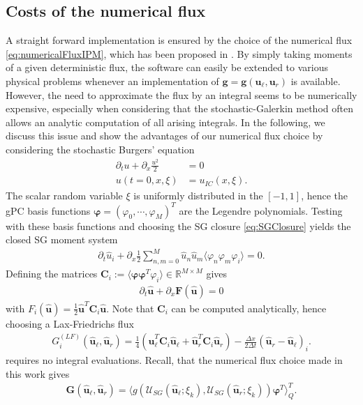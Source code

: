 \subsection{Costs of the numerical flux}
A straight forward implementation is ensured by the choice of the numerical flux \eqref{eq:numericalFluxIPM}, which has been proposed in \cite{kusch2017maximum}. By simply taking moments of a given deterministic flux, the software can easily be extended to various physical problems whenever an implementation of $\bm g = \bm g(\bm u_\ell, \bm u_r)$ is available. However, the need to approximate the flux by an integral seems to be numerically expensive, especially when considering that the stochastic-Galerkin method often allows an analytic computation of all arising integrals. In the following, we discuss this issue and show the advantages of our numerical flux choice by considering the stochastic Burgers' equation
\begin{align*}
\partial_t u + \partial_x \frac{u^2}{2} &= 0\\
u(t=0,x,\xi) &= u_{IC}(x,\xi).
\end{align*}
The scalar random variable $\xi$ is uniformly distributed in the $[-1,1]$, hence the gPC basis functions $\bm\varphi=(\varphi_0,\cdots,\varphi_M)^T$ are the Legendre polynomials. Testing with these basis functions and choosing the SG closure \eqref{eq:SGClosure} yields the closed SG moment system
\begin{align*}
\partial_t \hat u_i + \partial_x \frac12\sum_{n,m = 0}^M \hat u_n \hat u_m \langle \varphi_n\varphi_m\varphi_i \rangle = 0.
\end{align*}
Defining the matrices $\bm C_i := \langle \bm\varphi\bm\varphi^T\varphi_i\rangle\in\mathbb{R}^{M\times M}$ gives
\begin{align*}
\partial_t \bm{\hat u} + \partial_x \bm F(\bm{\hat u}) = 0
\end{align*}
with $F_i(\bm{\hat u}) = \frac12\bm{\hat u}^T\bm C_i\bm{\hat u}$. Note that $\bm{C}_i$ can be computed analytically, hence choosing a Lax-Friedrichs flux
\begin{align}\label{eq:numFluxAnalytic}
G_i^{(LF)}(\bm{\hat u}_{\ell},\bm{\hat u}_{r}) =\frac{1}{4}\left(\bm{\hat u}_{\ell}^T \bm{C}_i \bm{\hat u}_{\ell}+\bm{\hat u}_{r}^T \bm{C}_i \bm{\hat u}_{r}\right) - \frac{\Delta x}{2\Delta t}(\bm{\hat u}_{r}-\bm{\hat u}_{\ell})_i.
\end{align}
requires no integral evaluations. Recall, that the numerical flux choice made in this work gives
\begin{align}\label{eq:numericalFluxIPMBurgers}
 \bm{G}(\bm{\hat u}_{\ell},\bm{\hat u}_{r}) = \langle g(\mathcal{U}_{SG}(\bm{\hat u}_{\ell};\xi_k),\mathcal{U}_{SG}(\bm{\hat u}_{r};\xi_k))\bm{\varphi}^T\rangle^T_Q.
\end{align}
